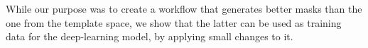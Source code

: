 While our purpose was to create a workflow that generates better masks than the one from the template space, we show that the latter can be used as training data for the deep-learning model, by applying small changes to it.
